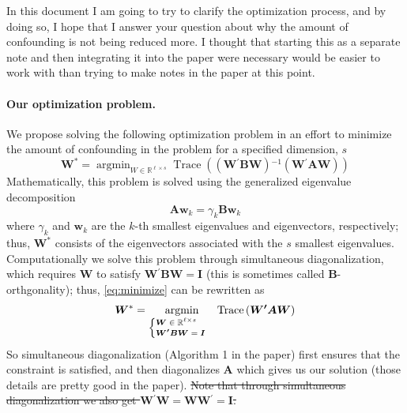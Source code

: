 \documentclass[12pt]{article} %
\newcommand{\inv}{\ensuremath{^{-1}}}
\newcommand{\trans}{\ensuremath{^\prime}}
\DeclareMathOperator{\tr}{Trace}
\DeclareMathOperator*{\argmin}{argmin}
\begin{document}
In this document I am going to try to clarify the optimization process, and by doing so, I hope that I answer your question about why the amount of confounding is not being reduced more. I thought that starting this as a separate note and then integrating it into the paper were necessary would be easier to work with than trying to make notes in the paper at this point.

\paragraph{Our optimization problem.} We propose solving the following optimization problem in an effort to minimize the amount of confounding in the problem for a specified dimension, $s$
%
\begin{equation}\label{eq:minimize}
\bm{W}^* = \argmin_{W \in \mathbb{R}^{\ell \times s} } 
\tr\left( \left(\bm{W\trans B W} \right)\inv \left(\bm{W\trans A W}\right) \right)
\end{equation}
%
Mathematically, this problem is solved using the generalized eigenvalue decomposition
\begin{equation}\label{eq:geigen}
	\bm{Aw}_k = \gamma_k \bm{Bw}_k
\end{equation}
where $\gamma_k$ and $\bm{w}_k$ are the $k$-th smallest eigenvalues and eigenvectors, respectively; thus, $\bm{W}^*$ consists of the eigenvectors associated with the $s$ smallest eigenvalues. Computationally we solve this problem through simultaneous diagonalization, which requires $\bm{W}$ to satisfy $\bm{W\trans B W} = \bm{I}$ (this is sometimes called $\bm{B}$-orthgonality); thus, \eqref{eq:minimize} can be rewritten as
%
\begin{equation}
\bm{W}^* = \argmin_{ 
\begin{scriptsize}
	\begin{cases}
      \bm{W} \in \mathbb{R}^{\ell \times s} \\
      \bm{W\trans B W} = \bm{I}
	\end{cases}
\end{scriptsize}
	} 
\tr\left( \bm{W\trans A W} \right) 
\end{equation}
%
So simultaneous diagonalization (Algorithm 1 in the paper) first ensures that the constraint is satisfied, and then diagonalizes $\bm{A}$ which gives us our solution (those details are pretty good in the paper). \sout{Note that through simultaneous diagonalization we also get $\bm{W}\trans \bm{W} = \bm{WW}\trans = \bm{I}$.}
\end{document}
